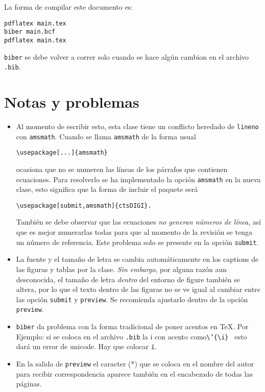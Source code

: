 \documentclass[submit,biblatex]{ctsDIGI}
\begin{document}
La forma de compilar este documento es:
\begin{verbatim}
pdflatex main.tex
biber main.bcf
pdflatex main.tex
\end{verbatim}
\texttt{biber} se debe volver a correr solo cuando se hace algún cambion en el archivo \texttt{.bib}.

\section{Notas y problemas}
\begin{itemize}
\item Al momento de escribir esto, esta clase tiene un conflicto heredado de \texttt{lineno} con  \texttt{amsmath}. Cuando se llama \texttt{amsmath} de la forma usual
\begin{verbatim}
\usepackage[...]{amsmath}
\end{verbatim}
ocasiona que no se numeren las líneas de los párrafos que contienen ecuaciones. Para resolverlo se ha implementado la opción \texttt{amsmath} en la nueva clase, esto significa que la forma de incluir el paquete será
\begin{verbatim}
\usepackage[submit,amsmath]{ctsDIGI}.
\end{verbatim}
También se debe observar que las ecuaciones \emph{no generan números de línea}, así que es mejor numerarlas todas para que al momento de la revisión se tenga un número de referencia. Este problema solo se presente en la opción \texttt{submit}.

\item La fuente y el tamaño de letra se cambia automáticamente en los captions de las figuras y tablas por la clase. \emph{Sin embargo}, por alguna razón aun desconocida, el tamaño de letra \emph{dentro} del entorno de figure también se altera, por lo que el texto dentro de las figuras no se ve igual al cambiar entre las opción \texttt{submit} y \texttt{preview}. Se recomienda ajustarlo dentro de la opción \texttt{preview}.

\item \texttt{biber} da problema con la forma tradicional de poner acentos en \TeX. Por Ejemplo: si se coloca en el archivo \texttt{.bib} la i con acento como\texttt{\textbackslash'\{\textbackslash i\} } esto dará un error de unicode. Hay que colocar \texttt{í}.

\item En la salida de \texttt{preview} el caracter (*) que se coloca en el nombre del autor para recibir correspondencia aparece también en el encabezado de todas las páginas.

\end{itemize}
\end{document}
